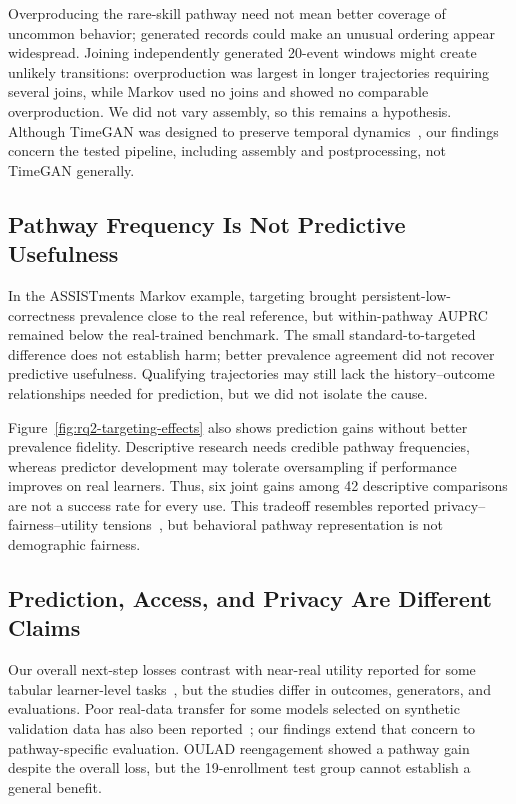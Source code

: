 \documentclass[fleqn,10pt]{JLA_article}
\begin{document}
Overproducing the rare-skill pathway need not mean better coverage of uncommon behavior; generated records could make an unusual ordering appear widespread. Joining independently generated 20-event windows might create unlikely transitions: overproduction was largest in longer trajectories requiring several joins, while Markov used no joins and showed no comparable overproduction. We did not vary assembly, so this remains a hypothesis. Although TimeGAN was designed to preserve temporal dynamics~\cite{yoon2019timegan}, our findings concern the tested pipeline, including assembly and postprocessing, not TimeGAN generally.

\subsection{Pathway Frequency Is Not Predictive Usefulness}

In the ASSISTments Markov example, targeting brought persistent-low-correctness prevalence close to the real reference, but within-pathway AUPRC remained below the real-trained benchmark. The small standard-to-targeted difference does not establish harm; better prevalence agreement did not recover predictive usefulness. Qualifying trajectories may still lack the history--outcome relationships needed for prediction, but we did not isolate the cause.

Figure~\ref{fig:rq2-targeting-effects} also shows prediction gains without better prevalence fidelity. Descriptive research needs credible pathway frequencies, whereas predictor development may tolerate oversampling if performance improves on real learners. Thus, six joint gains among 42 descriptive comparisons are not a success rate for every use. This tradeoff resembles reported privacy--fairness--utility tensions~\cite{liu2025fairprivate}, but behavioral pathway representation is not demographic fairness.

\subsection{Prediction, Access, and Privacy Are Different Claims}

Our overall next-step losses contrast with near-real utility reported for some tabular learner-level tasks~\cite{liu2024scaling,khalil2025artificial}, but the studies differ in outcomes, generators, and evaluations. Poor real-data transfer for some models selected on synthetic validation data has also been reported~\cite{flanagan2022fine}; our findings extend that concern to pathway-specific evaluation. OULAD reengagement showed a pathway gain despite the overall loss, but the 19-enrollment test group cannot establish a general benefit.
\end{document}
